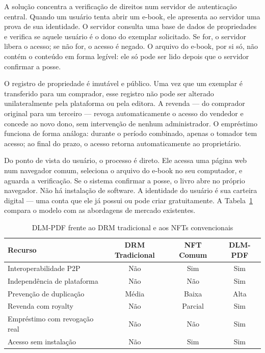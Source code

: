 \documentclass[12pt]{article}
\begin{document}
A solução concentra a verificação de direitos num servidor de autenticação central. Quando um usuário tenta abrir um e-book, ele apresenta ao servidor uma prova de sua identidade. O servidor consulta uma base de dados de propriedades e verifica se aquele usuário é o dono do exemplar solicitado. Se for, o servidor libera o acesso; se não for, o acesso é negado. O arquivo do e-book, por si só, não contém o conteúdo em forma legível: ele só pode ser lido depois que o servidor confirmar a posse.

O registro de propriedade é imutável e público. Uma vez que um exemplar é transferido para um comprador, esse registro não pode ser alterado unilateralmente pela plataforma ou pela editora. A revenda — do comprador original para um terceiro — revoga automaticamente o acesso do vendedor e concede ao novo dono, sem intervenção de nenhum administrador. O empréstimo funciona de forma análoga: durante o período combinado, apenas o tomador tem acesso; ao final do prazo, o acesso retorna automaticamente ao proprietário.

Do ponto de vista do usuário, o processo é direto. Ele acessa uma página web num navegador comum, seleciona o arquivo do e-book no seu computador, e aguarda a verificação. Se o sistema confirmar a posse, o livro abre no próprio navegador. Não há instalação de software. A identidade do usuário é sua carteira digital — uma conta que ele já possui ou pode criar gratuitamente. A Tabela~\ref{tab:comparativo} compara o modelo com as abordagens de mercado existentes.

\begin{table}[H]
\centering
\caption{DLM-PDF frente ao DRM tradicional e aos NFTs convencionais}
\label{tab:comparativo}
\begin{tabular}{|l|c|c|c|}
\hline
\textbf{Recurso}              & \textbf{DRM Tradicional} & \textbf{NFT Comum} & \textbf{DLM-PDF} \\
\hline
Interoperabilidade P2P        & Não     & Sim      & Sim  \\
\hline
Independência de plataforma   & Não     & Não      & Sim  \\
\hline
Prevenção de duplicação       & Média   & Baixa    & Alta \\
\hline
Revenda com royalty           & Não     & Parcial  & Sim  \\
\hline
Empréstimo com revogação real & Não     & Não      & Sim  \\
\hline
Acesso sem instalação         & Não     & Sim      & Sim  \\
\hline
\end{tabular}
\end{table}
\end{document}
